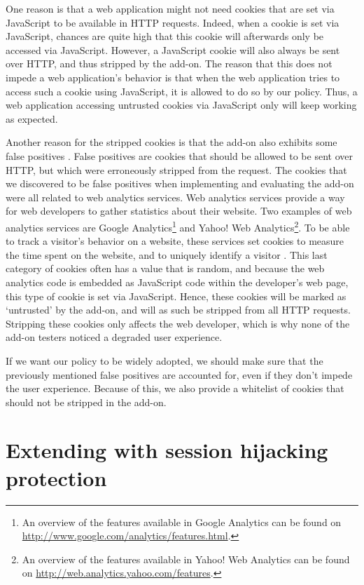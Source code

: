 One reason is that a web application might not need cookies that are set via JavaScript to be available in HTTP requests. Indeed, when a cookie is set via JavaScript, chances are quite high that this cookie will afterwards only be accessed via JavaScript.  However, a JavaScript cookie will also always be sent over HTTP, and thus stripped by the add-on. The reason that this does not impede a web application's behavior is that when the web application tries to access such a cookie using JavaScript, it is allowed to do so by our policy. Thus, a web application accessing untrusted cookies via JavaScript only will keep working as expected.

Another reason for the stripped cookies is that the add-on also exhibits some false positives \cite{Bonne2011}. False positives are cookies that should be allowed to be sent over HTTP, but which were erroneously stripped from the request. The cookies that we discovered to be false positives when implementing and evaluating the add-on were all related to web analytics services. Web analytics services provide a way for web developers to gather statistics about their website. Two examples of web analytics services are Google Analytics\footnote{An overview of the features available in Google Analytics can be found on \url{http://www.google.com/analytics/features.html}.} and Yahoo! Web Analytics\footnote{An overview of the features available in Yahoo! Web Analytics can be found on \url{http://web.analytics.yahoo.com/features}.}. To be able to track a visitor's behavior on a website, these services set cookies to measure the time spent on the website, and to uniquely identify a visitor \cite{Tappenden2009,GoogleAnalytics}. This last category of cookies often has a value that is random, and because the web analytics code is embedded as JavaScript code within the developer's web page, this type of cookie is set via JavaScript. Hence, these cookies will be marked as `untrusted' by the add-on, and will as such be stripped from all HTTP requests. Stripping these cookies only affects the web developer, which is why none of the add-on testers noticed a degraded user experience.

If we want our policy to be widely adopted, we should make sure that the previously mentioned false positives are accounted for, even if they don't impede the user experience. Because of this, we also provide a whitelist of cookies that should not be stripped in the add-on.

\section{Extending with session hijacking protection}

